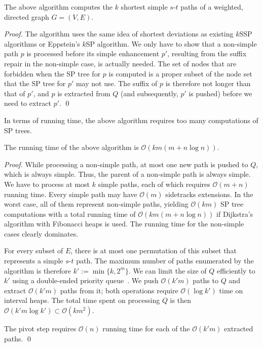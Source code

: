 \documentclass[runningheads,a4paper]{llncs}
\begin{document}
\begin{lemma}
	The above algorithm computes the $k$ shortest simple $s$-$t$ paths of a weighted, directed graph $G = (V, E)$.
\end{lemma}
\begin{proof}
	The algorithm uses the same idea of shortest deviations as existing $k$SSP algorithms or Eppstein's $k$SP algorithm.
	We only have to show that a non-simple path $p$ is processed before its simple enhancement $p'$, resulting from the suffix repair in the non-simple case, is actually needed.
	The set of nodes that are forbidden when the SP tree for $p$ is computed is a proper subset of the node set that the SP tree for $p'$ may not use.
	The suffix of $p$ is therefore not longer than that of $p'$, and $p$ is extracted from $Q$ (and subsequently, $p'$ is pushed) before we need to extract $p'$.
	\qed
\end{proof}

In terms of running time, the above algorithm requires too many computations of SP trees.

\begin{lemma}
	The running time of the above algorithm is $\mathcal O(km(m + n \log n))$.
\end{lemma}
\begin{proof}
	While processing a non-simple path, at most one new path is pushed to $Q$, which is always simple.
	Thus, the parent of a non-simple path is always simple.
    We have to process at most $k$ simple paths, each of which requires $\mathcal O(m + n)$ running time.
	Every simple path may have $\mathcal O(m)$ sidetracks extensions.
	In the worst case, all of them represent non-simple paths, yielding $\mathcal O(km)$ SP tree computations with a total running time of $\mathcal O(km(m + n\log n))$ if Dijkstra's algorithm with Fibonacci heaps is used.
	The running time for the non-simple cases clearly dominates.

	For every subset of $E$, there is at most one permutation of this subset that represents a simple $s$-$t$ path.
    The maximum number of paths enumerated by the algorithm is therefore $k' := \min\{k, 2^m\}$.
    We can limit the size of $Q$ efficiently to $k'$ using a double-ended priority queue~\cite{CUSTOM:book/sahni1999}.
    We push $\mathcal O(k'm)$ paths to $Q$ and extract $\mathcal O(k'm)$ paths from it; both operations require $\mathcal O(\log k')$ time on interval heaps.
    The total time spent on processing $Q$ is then $\mathcal O(k'm\log k') \subset \mathcal O(km^2)$.

    The pivot step requires $\mathcal O(n)$ running time for each of the $\mathcal O(k'm)$ extracted paths.
    \qed
\end{proof}
\end{document}
